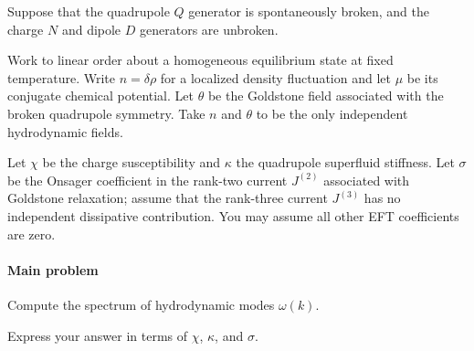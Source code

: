 Suppose that the quadrupole $Q$ generator is spontaneously broken, and the
charge $N$ and dipole $D$ generators are unbroken.

{\color{blue}
Work to linear order about a homogeneous equilibrium state at fixed
temperature. Write $n=\delta\rho$ for a localized density fluctuation and let
$\mu$ be its conjugate chemical potential. Let $\theta$ be the Goldstone field
associated with the broken quadrupole symmetry. Take $n$ and $\theta$ to be the
only independent hydrodynamic fields.

Let $\chi$ be the charge susceptibility and $\kappa$ the quadrupole superfluid
stiffness. Let $\sigma$ be the Onsager coefficient in the rank-two current
$J^{(2)}$ associated with Goldstone relaxation; assume that the rank-three
current $J^{(3)}$ has no independent dissipative contribution. You may assume
all other EFT coefficients are zero.
}

\paragraph*{Main problem}

Compute the spectrum of hydrodynamic modes $\omega(k)$.

Express your answer in terms of $\chi$, $\kappa$, and $\sigma$.
